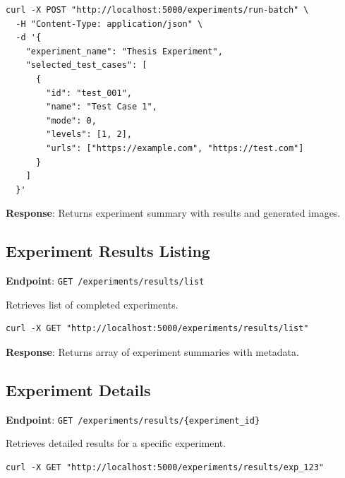 \begin{tcolorbox}[
    colback=gray!5!white,
    colframe=gray!60!black,
    title=\textbf{cURL Example},
    enhanced
]
\begin{verbatim}
curl -X POST "http://localhost:5000/experiments/run-batch" \
  -H "Content-Type: application/json" \
  -d '{
    "experiment_name": "Thesis Experiment",
    "selected_test_cases": [
      {
        "id": "test_001",
        "name": "Test Case 1",
        "mode": 0,
        "levels": [1, 2],
        "urls": ["https://example.com", "https://test.com"]
      }
    ]
  }'
\end{verbatim}
\end{tcolorbox}

\textbf{Response}: Returns experiment summary with results and generated images.

\subsection{Experiment Results Listing}
\label{subsec:experiments-list}

\textbf{Endpoint}: \texttt{GET /experiments/results/list}

Retrieves list of completed experiments.

\begin{tcolorbox}[
    colback=gray!5!white,
    colframe=gray!60!black,
    title=\textbf{cURL Example},
    enhanced
]
\begin{verbatim}
curl -X GET "http://localhost:5000/experiments/results/list"
\end{verbatim}
\end{tcolorbox}

\textbf{Response}: Returns array of experiment summaries with metadata.

\subsection{Experiment Details}
\label{subsec:experiment-details}

\textbf{Endpoint}: \texttt{GET /experiments/results/\{experiment\_id\}}

Retrieves detailed results for a specific experiment.

\begin{tcolorbox}[
    colback=gray!5!white,
    colframe=gray!60!black,
    title=\textbf{cURL Example},
    enhanced
]
\begin{verbatim}
curl -X GET "http://localhost:5000/experiments/results/exp_123"
\end{verbatim}
\end{tcolorbox}

